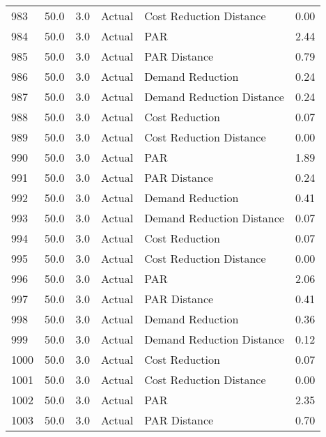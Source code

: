\begin{longtable}{lrrllr}
983  &         50.0 &     3.0 &         Actual &    Cost Reduction Distance &   0.00 \\
984  &         50.0 &     3.0 &         Actual &                        PAR &   2.44 \\
985  &         50.0 &     3.0 &         Actual &               PAR Distance &   0.79 \\
986  &         50.0 &     3.0 &         Actual &           Demand Reduction &   0.24 \\
987  &         50.0 &     3.0 &         Actual &  Demand Reduction Distance &   0.24 \\
988  &         50.0 &     3.0 &         Actual &             Cost Reduction &   0.07 \\
989  &         50.0 &     3.0 &         Actual &    Cost Reduction Distance &   0.00 \\
990  &         50.0 &     3.0 &         Actual &                        PAR &   1.89 \\
991  &         50.0 &     3.0 &         Actual &               PAR Distance &   0.24 \\
992  &         50.0 &     3.0 &         Actual &           Demand Reduction &   0.41 \\
993  &         50.0 &     3.0 &         Actual &  Demand Reduction Distance &   0.07 \\
994  &         50.0 &     3.0 &         Actual &             Cost Reduction &   0.07 \\
995  &         50.0 &     3.0 &         Actual &    Cost Reduction Distance &   0.00 \\
996  &         50.0 &     3.0 &         Actual &                        PAR &   2.06 \\
997  &         50.0 &     3.0 &         Actual &               PAR Distance &   0.41 \\
998  &         50.0 &     3.0 &         Actual &           Demand Reduction &   0.36 \\
999  &         50.0 &     3.0 &         Actual &  Demand Reduction Distance &   0.12 \\
1000 &         50.0 &     3.0 &         Actual &             Cost Reduction &   0.07 \\
1001 &         50.0 &     3.0 &         Actual &    Cost Reduction Distance &   0.00 \\
1002 &         50.0 &     3.0 &         Actual &                        PAR &   2.35 \\
1003 &         50.0 &     3.0 &         Actual &               PAR Distance &   0.70 \\

\end{longtable}
